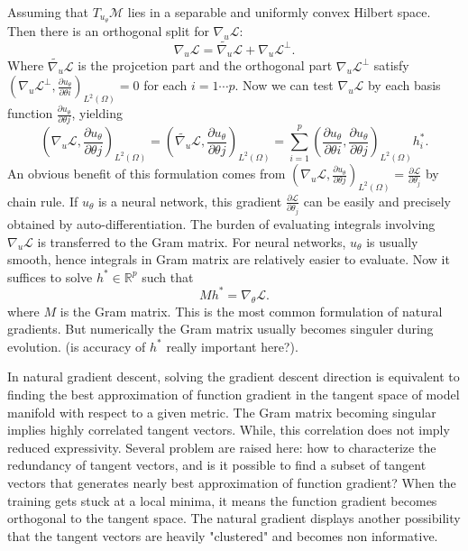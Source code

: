\documentclass{article}
\begin{document}
Assuming that $T_{u_\theta}\mathcal{M}$ lies in a separable and uniformly convex Hilbert space. 
Then there is an orthogonal split for $\nabla_u \mathcal{L}$:
\[
    \nabla_u \mathcal{L} = \tilde{\nabla_u} \mathcal{L} + \nabla_u \mathcal{L}^{\perp}.
\]
Where $\tilde{\nabla_u} \mathcal{L}$ is the projcetion part and the orthogonal part $\nabla_u \mathcal{L}^{\perp}$ satisfy $(\nabla_u \mathcal{L}^{\perp},\frac{\partial u_\theta}{\partial\theta i})_{L^2(\Omega)}=0$ for each $i=1\cdots p$. Now we can test $\nabla_u\mathcal{L}$ by each basis function $\frac{\partial u_\theta}{\partial\theta j}$, yielding 
\[
    (\nabla_u \mathcal{L},\frac{\partial u_\theta}{\partial\theta j})_{L^2(\Omega)} = (\tilde{\nabla_u} \mathcal{L},\frac{\partial u_\theta}{\partial\theta j})_{L^2(\Omega)} = \sum_{i=1}^p (\frac{\partial u_\theta}{\partial\theta i},\frac{\partial u_\theta}{\partial\theta j})_{L^2(\Omega)}h^*_i.
\]
An obvious benefit of this formulation comes from $(\nabla_u \mathcal{L},\frac{\partial u_\theta}{\partial\theta j})_{L^2(\Omega)}=\frac{\partial \mathcal{L}}{\partial\theta_j}$ by chain rule. If $u_\theta$ is a neural network, this gradient $\frac{\partial \mathcal{L}}{\partial\theta_j}$ can be easily and precisely obtained by auto-differentiation. The burden of evaluating integrals involving $\nabla_u\mathcal{L}$ is transferred to the Gram matrix. For neural networks, $u_\theta$ is usually smooth, hence integrals in Gram matrix are relatively easier to evaluate. Now it suffices to solve $h^*\in\mathbb{R}^p$ such that 
\[
    Mh^*=\nabla_\theta\mathcal{L}.
\]
where $M$ is the Gram matrix. This is the most common formulation of natural gradients. But numerically the Gram matrix usually becomes singuler during evolution. (is accuracy of $h^*$ really important here?).

In natural gradient descent, solving the gradient descent direction is equivalent to finding the best approximation of function gradient in the tangent space of model manifold with respect to a given metric. The Gram matrix becoming singular implies highly correlated tangent vectors. While, this correlation does not imply reduced expressivity. Several problem are raised here: how to characterize the redundancy of tangent vectors, and is it possible to find a subset of tangent vectors that generates nearly best approximation of function gradient? When the training gets stuck at a local minima, it means the function gradient becomes orthogonal to the tangent space. The natural gradient displays another possibility that the tangent vectors are heavily "clustered" and becomes non informative. 
\end{document}
